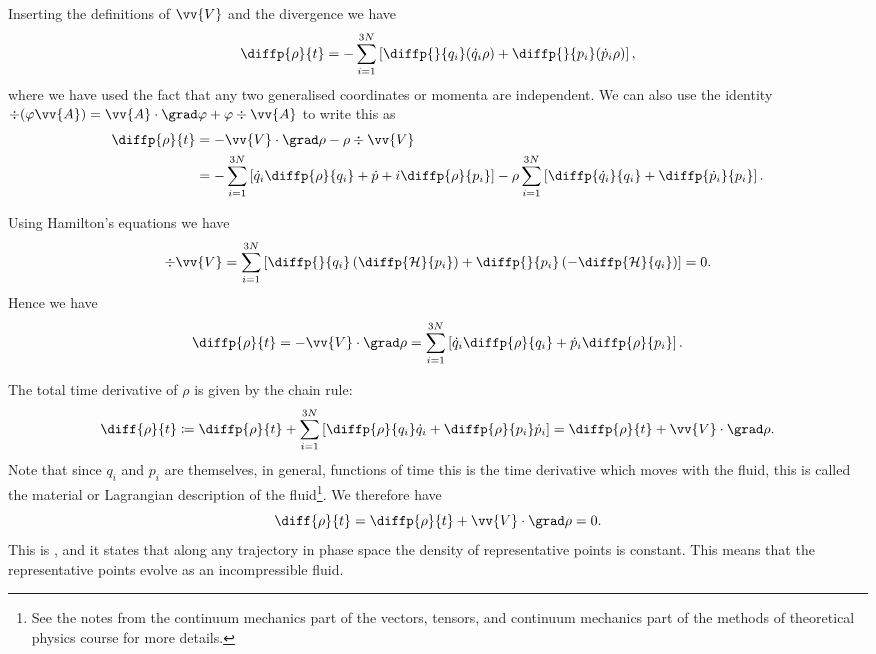 \documentclass[fleqn]{NotesClass}
\newcommand*{\hamiltonian}{\mathcal{H}}
\begin{document}
    Inserting the definitions of \(\vv{V}\) and the divergence we have
    \begin{equation}
        \diffp{\rho}{t} = - \sum_{i = 1}^{3N}\left[ \diffp{}{q_i}(\dot{q}_i\rho) + \diffp{}{p_i}(\dot{p}_i\rho) \right],
    \end{equation}
    where we have used the fact that any two generalised coordinates or momenta are independent.
    We can also use the identity \(\div(\varphi\vv{A}) = \vv{A}\cdot\grad\varphi + \varphi\div\vv{A}\) to write this as
    \begin{align}
        \diffp{\rho}{t} &= -\vv{V}\cdot\grad\rho - \rho\div\vv{V}\\
        &= -\sum_{i = 1}^{3N} \left[ \dot{q}_i\diffp{\rho}{q_i} + \dot{p}+i\diffp{\rho}{p_i} \right] - \rho\sum_{i = 1}^{3N} \left[ \diffp{\dot{q}_i}{q_i} + \diffp{\dot{p}_i}{p_i} \right].
    \end{align}
    
    Using Hamilton's equations we have
    \begin{equation}
        \div\vv{V} = \sum_{i = 1}^{3N} \left[ \diffp{}{q_i}\left( \diffp{\hamiltonian}{p_i} \right) + \diffp{}{p_i} \left( -\diffp{\hamiltonian}{q_i} \right) \right] = 0.
    \end{equation}
    Hence we have
    \begin{equation}
        \diffp{\rho}{t} = -\vv{V} \cdot \grad \rho = \sum_{i = 1}^{3N} \left[ \dot{q}_i\diffp{\rho}{q_i} + \dot{p}_i\diffp{\rho}{p_i} \right].
    \end{equation}
    
    The total time derivative of \(\rho\) is given by the chain rule:
    \begin{equation}
        \diff{\rho}{t} \coloneqq \diffp{\rho}{t} + \sum_{i = 1}^{3N}\left[ \diffp{\rho}{q_i}\dot{q}_i + \diffp{\rho}{p_i}\dot{p}_i \right] = \diffp{\rho}{t} + \vv{V} \cdot \grad \rho.
    \end{equation}
    Note that since \(q_i\) and \(p_i\) are themselves, in general, functions of time this is the time derivative which moves with the fluid, this is called the material or Lagrangian description of the fluid\footnote{See the notes from the continuum mechanics part of the vectors, tensors, and continuum mechanics part of the methods of theoretical physics course for more details.}.
    We therefore have
    \begin{equation}
        \diff{\rho}{t} = \diffp{\rho}{t} + \vv{V}\cdot\grad\rho = 0.
    \end{equation}
    This is , and it states that along any trajectory in phase space the density of representative points is constant.
    This means that the representative points evolve as an incompressible fluid.
    
\end{document}

